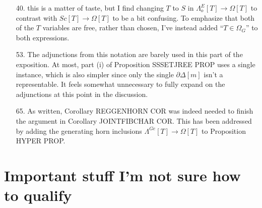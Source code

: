 \documentclass{article}
\begin{document}
\begin{itemize}
\item[40.] this is a matter of taste, but I find changing $T$ to $S$ in $\Lambda^E_o[T] \to \Omega[T]$ to contrast with $Sc[T] \to \Omega[T]$ to be a bit confusing. To emphasize that both of the $T$ variables are free, rather than chosen, I've instead added ``$T\in \Omega_G$'' to both expressions.

\item[53.] The adjunctions from this notation are barely used in this part of the exposition. At most, part (i) of Proposition SSSETJREE PROP uses a single instance, which is also simpler since only the single $\partial \Delta[m]$ isn't a representable. It feels somewhat unnecessary to fully expand on the adjunctions at this point in the discussion. 



\item[65.] As written, Corollary REGGENHORN COR was indeed needed to finish the argument in Corollary JOINTFIBCHAR COR. This has been addressed by adding the generating horn inclusions $\Lambda^{Ge}[T] \to \Omega[T]$ to Proposition HYPER PROP.


\end{itemize}



\section{Important stuff I'm not sure how to qualify}
\end{document}
